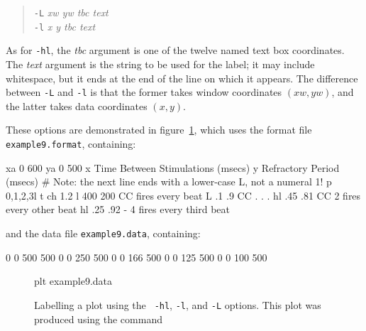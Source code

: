 \documentclass{book}
\begin{document}
\begin{quote}
{\tt -L} \emph{xw yw tbc text}\\
{\tt -l} \emph{x y tbc text}
\end{quote}

%
%
%
As for {\tt -hl}, the {\em tbc} argument is one of the twelve named text box
coordinates.  The {\em text} argument is the string to be used for the label;
it may include whitespace, but it ends at the end of the line on which it
appears.  The difference between {\tt -L} and {\tt -l} is that the former
takes window coordinates $(xw,yw)$, and the latter takes data coordinates
$(x,y)$.

These options are demonstrated in figure~\ref{fig:example9}, which uses the
format file {\tt example9.format}, containing:
\begin{center}
\begin{boxedverbatim}
xa 0 600
ya 0 500
x Time Between Stimulations (msecs)
y Refractory Period (msecs)
# Note: the next line ends with a lower-case L, not a numeral 1!
p 0,1,2,3l
t ch 1.2
l 400 200 CC fires every beat
L .1 .9 CC . . .
hl .45 .81 CC 2
fires every
other beat
hl .25 .92 - 4
  fires
 every
third
beat
\end{boxedverbatim}
\end{center}
and the data file {\tt example9.data}, containing:
\begin{center}
\begin{boxedverbatim}
0 0 500 500
0 0 250 500
0 0 166 500
0 0 125 500
0 0 100 500
\end{boxedverbatim}
\end{center}

\begin{figure}
\begin{center}
\end{center}
\caption[Labelling a plot]{Labelling a plot \label{fig:example9} using the {\tt
-hl}, {\tt -l}, and {\tt -L} options.  This plot was produced using the
command}
\begin{center}
\begin{boxedverbatim}
plt example9.data %
\end{boxedverbatim}
\end{center}
\end{figure}
\end{document}
